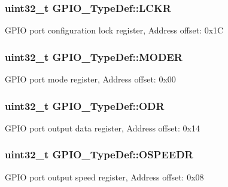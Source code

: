 \subsubsection[{\texorpdfstring{L\+C\+KR}{LCKR}}]{ uint32\+\_\+t G\+P\+I\+O\+\_\+\+Type\+Def\+::\+L\+C\+KR}\hypertarget{struct_g_p_i_o___type_def_a95a59d4b1d52be521f3246028be32f3e}{}\label{struct_g_p_i_o___type_def_a95a59d4b1d52be521f3246028be32f3e}
G\+P\+IO port configuration lock register, Address offset\+: 0x1C 
\subsubsection[{\texorpdfstring{M\+O\+D\+ER}{MODER}}]{ uint32\+\_\+t G\+P\+I\+O\+\_\+\+Type\+Def\+::\+M\+O\+D\+ER}\hypertarget{struct_g_p_i_o___type_def_ac2505d096b6b650f1647b8e0ff8b196b}{}\label{struct_g_p_i_o___type_def_ac2505d096b6b650f1647b8e0ff8b196b}
G\+P\+IO port mode register, Address offset\+: 0x00 
\subsubsection[{\texorpdfstring{O\+DR}{ODR}}]{ uint32\+\_\+t G\+P\+I\+O\+\_\+\+Type\+Def\+::\+O\+DR}\hypertarget{struct_g_p_i_o___type_def_a6fb78f4a978a36032cdeac93ac3c9c8b}{}\label{struct_g_p_i_o___type_def_a6fb78f4a978a36032cdeac93ac3c9c8b}
G\+P\+IO port output data register, Address offset\+: 0x14 
\subsubsection[{\texorpdfstring{O\+S\+P\+E\+E\+DR}{OSPEEDR}}]{ uint32\+\_\+t G\+P\+I\+O\+\_\+\+Type\+Def\+::\+O\+S\+P\+E\+E\+DR}\hypertarget{struct_g_p_i_o___type_def_a0d233d720f18ae2050f9131fa6faf7c6}{}\label{struct_g_p_i_o___type_def_a0d233d720f18ae2050f9131fa6faf7c6}
G\+P\+IO port output speed register, Address offset\+: 0x08 
